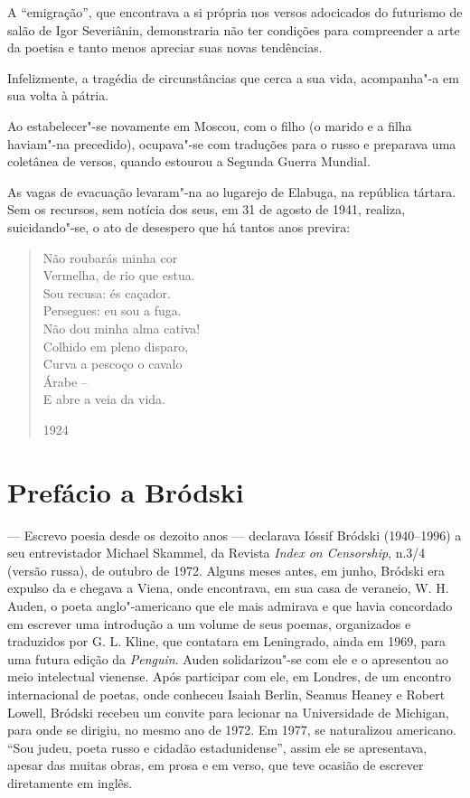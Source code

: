 A ``emigração'', que encontrava a si própria nos versos adocicados do
futurismo de salão de Igor Severiânin, demonstraria não ter condições
para compreender a arte da poetisa e tanto menos apreciar suas novas
tendências.

Infelizmente, a tragédia de circunstâncias que cerca a sua vida,
acompanha"-a em sua volta à pátria.

Ao estabelecer"-se novamente em Moscou, com o filho (o marido e a filha
haviam"-na precedido), ocupava"-se com traduções para o russo e preparava
uma coletânea de versos, quando estourou a Segunda Guerra Mundial.

As vagas de evacuação levaram"-na ao lugarejo de Elabuga, na república
tártara. Sem os recursos, sem notícia dos seus, em 31 de agosto de 1941,
realiza, suicidando"-se, o ato de desespero que há tantos anos previra:

\begin{verse}
Não roubarás minha cor \\
Vermelha, de rio que estua. \\
Sou recusa: és caçador. \\
Persegues: eu sou a fuga. \\[8pt]
Não dou minha alma cativa! \\
Colhido em pleno disparo, \\
Curva a pescoço o cavalo \\
Árabe -- \\
E abre a veia da vida. \\
\begin{flushright}
1924
  \end{flushright}
\end{verse}


\chapter{Prefácio a Bródski}

--- Escrevo poesia desde os dezoito anos --- declarava Ióssif Bródski
(1940--1996) a seu entrevistador Michael Skammel, da Revista \emph{Index
on Censorship}, n.3/4 (versão russa), de outubro de 1972. Alguns meses
antes, em junho, Bródski era expulso da  e chegava a Viena, onde
encontrava, em sua casa de veraneio, W. H. Auden, o poeta
anglo"-americano que ele mais admirava e que havia concordado em escrever
uma introdução a um volume de seus poemas, organizados e traduzidos por
G. L. Kline, que contatara em Leningrado, ainda em 1969, para uma
futura edição da \emph{Penguin}. Auden solidarizou"-se com ele e o apresentou ao
meio intelectual vienense. Após participar com ele, em Londres, de um
encontro internacional de poetas, onde conheceu Isaiah Berlin, Seamus
Heaney e Robert Lowell, Bródski recebeu um convite para lecionar na
Universidade de Michigan, para onde se dirigiu, no mesmo ano de 1972. Em
1977, se naturalizou americano. ``Sou judeu, poeta russo e cidadão
estadunidense'', assim ele se apresentava, apesar das muitas obras, em
prosa e em verso, que teve ocasião de escrever diretamente em inglês.

